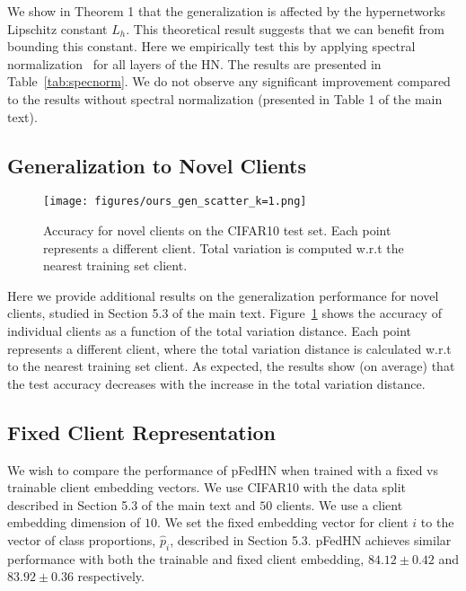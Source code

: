 \documentclass{article}
\newcommand\ourmethod{pFedHN}
\begin{document}
 We show in Theorem 1 that the generalization is affected by the hypernetworks Lipschitz constant $L_h$. This theoretical result suggests that we can benefit from bounding this constant. Here we empirically test this by applying spectral normalization~\cite{spectral_normalization} for all layers of the HN. The results are presented in Table~\ref{tab:specnorm}. We do not observe any significant improvement compared to the results without spectral normalization (presented in Table 1 of the main text).






\subsection{Generalization to Novel Clients}

\begin{figure}[h]
    \centering
    \texttt{[image: figures/ours\_gen\_scatter\_k=1.png]}
    \caption{Accuracy for novel clients on the CIFAR10 test set. Each point represents a different client. Total variation is computed w.r.t the nearest training set client.}
    \label{fig:gen_raw}
\end{figure}

Here we provide additional results on the generalization performance for novel clients, studied in Section 5.3 of the main text. Figure~\ref{fig:gen_raw} shows the accuracy of individual clients as a function of the total variation distance. Each point represents a different client, where the total variation distance is calculated w.r.t to the nearest training set client. As expected, the results show (on average) that the test accuracy decreases with the increase in the total variation distance.

\subsection{Fixed Client Representation}

We wish to compare the performance of \ourmethod{} when trained with a fixed vs trainable client embedding vectors. We use CIFAR10 with the data split described in Section 5.3 of the main text and $50$ clients. We use a client embedding dimension of $10$. We set the fixed embedding vector for client $i$ to the vector of class proportions, $\hat{p}_i$, described in Section 5.3. \ourmethod{} achieves similar performance with both the trainable and fixed client embedding, $84.12\pm0.42$ and $83.92\pm0.36$ respectively.
 
\end{document}
